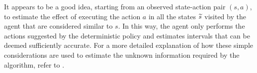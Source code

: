 It appears to be a good idea, starting from an observed state-action pair $(s,a)$, to estimate the effect of executing the action $a$ in all the states $\widetilde{s}$ visited by the agent that are considered similar to $s$. In this way, the agent only performs the actions suggested by the deterministic policy and estimates intervals that can be deemed sufficiently accurate. For a more detailed explanation of how these simple considerations are used to estimate the unknown information required by the algorithm, refer to .
